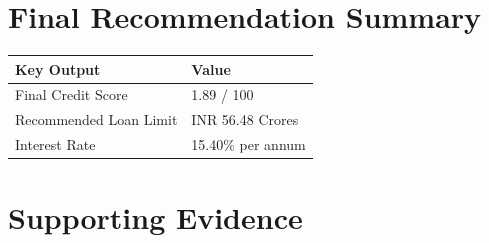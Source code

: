 \documentclass[11pt,a4paper]{article}
\begin{document}
\section*{Final Recommendation Summary}
\begin{longtable}{p{3.2cm} p{1.8cm}}
\toprule
Key Output & Value \\
\midrule
\endhead
Final Credit Score & 1.89 / 100 \\
Recommended Loan Limit & INR 56.48 Crores \\
Interest Rate & 15.40\% per annum \\
\bottomrule
\end{longtable}

\section*{Supporting Evidence}
\end{document}
